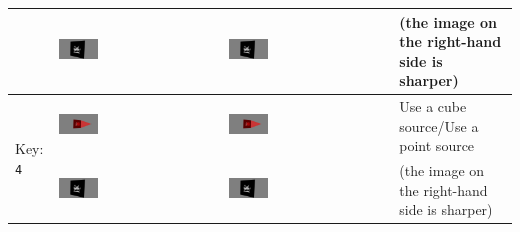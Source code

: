 \documentclass[10pt]{article}
\begin{document}
\begin{center}
\begin{longtable}{|m{}|m{}|m{}|m{}|}
			&	\includegraphics[width=0.25\textwidth]{square_source_xray.png}	&	\includegraphics[width=0.25\textwidth]{point_source_xray.png}	&	(the image on the right-hand side is sharper) \\
		\hline
		    \multirow{2}{*}{Key: \texttt{4}}	&	\includegraphics[width=0.25\textwidth]{cube_source.png}	&	\includegraphics[width=0.25\textwidth]{point_source.png}	&	Use a cube source/Use a point source\\
			&	\includegraphics[width=0.25\textwidth]{cube_source_xray.png}	&	\includegraphics[width=0.25\textwidth]{point_source_xray.png}	&	(the image on the right-hand side is sharper) \\
		\hline
	\end{longtable}
\end{center}



\end{document}

